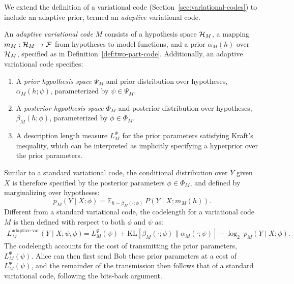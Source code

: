 We extend the definition of a variational code (Section~\ref{sec:variational-codes}) to include an adaptive prior, termed an \emph{adaptive} variational code.


\begin{defn}
An \emph{adaptive variational code} $M$ consists of a hypothesis space ${\mathcal{H}}_M$, a mapping $m_M : {\mathcal{H}}_M \rightarrow {\mathcal{F}}$ from hypotheses to model functions, and a prior $\alpha_M(h)$ over ${\mathcal{H}}_M$, specified as in Definition~\ref{def:two-part-code}. Additionally, an adaptive variational code specifies:
\begin{enumerate}
    \item A \emph{prior hypothesis space} $\Psi_M$ and prior distribution over hypotheses, $\alpha_M(h;\psi)$, parameterized by $\psi \in \Psi_M$.
    \item A \emph{posterior hypothesis space} $\Phi_M$ and posterior distribution over hypotheses, $\beta_M(h;\phi)$, parameterized by $\phi \in \Phi_M$.
    \item A description length measure $L^\Psi_M$ for the prior parameters satisfying Kraft's inequality, which can be interpreted as implicitly specifying a hyperprior over the prior parameters.
\end{enumerate}
\end{defn}

Similar to a standard variational code, the conditional distribution over $Y$ given $X$ is therefore specified by the posterior parameters $\phi \in \Phi_M$, and defined by marginalizing over hypotheses:
\begin{equation}
p_M(Y \mid X; \phi) = \mathbb{E}_{h \sim  \beta_M(\cdot;\phi)} ~P(Y \mid X;m_M(h)).
\end{equation}
Different from a standard variational code, the codelength for a variational code $M$ is then defined with respect to both $\phi$ and $\psi$ as:
\begin{align}
L_M^{\text{adaptive-var}}(Y \mid X; \psi,\phi) &= L^\Psi_M(\psi) + \text{KL}\left[ \beta_M(\cdot;\phi) \parallel \alpha_M(\cdot;\psi) \right] - \log_2~ p_M(Y \mid X; \phi). \label{eq:adaptive-variational-code-kl} 
\end{align}
The codelength accounts for the cost of transmitting the prior parameters, $L^\Psi_M(\psi)$. Alice can then first send Bob these prior parameters at a cost of $L^\Psi_M(\psi)$, and the remainder of the transmission then follows that of a standard variational code, following the bits-back argument.

